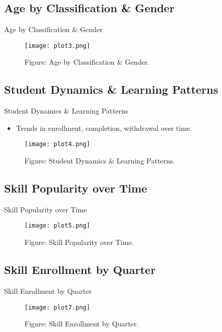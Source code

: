 \documentclass[11pt]{beamer}
\begin{document}
\subsection{Age by Classification \& Gender}
\begin{frame}{Age by Classification \& Gender}
    \begin{figure}
    \centering
    \texttt{[image: plot3.png]}
    \caption{Figure: Age by Classification \& Gender.}
    \end{figure}
\end{frame}

\subsection{Student Dynamics \& Learning Patterns}
\begin{frame}{Student Dynamics \& Learning Patterns}
  \begin{itemize}
    \item Trends in enrollment, completion, withdrawal over time.
  \end{itemize}
    \begin{figure}
    \centering
    \texttt{[image: plot4.png]}
    \caption{Figure: Student Dynamics \& Learning Patterns.}
    \end{figure}
\end{frame}

\subsection{Skill Popularity over Time}
\begin{frame}{Skill Popularity over Time}
    \begin{figure}
    \centering
    \texttt{[image: plot5.png]}
    \caption{Figure: Skill Popularity over Time.}
    \end{figure}
\end{frame}

\subsection{Skill Enrollment by Quarter}
\begin{frame}{Skill Enrollment by Quarter}
    \begin{figure}
    \centering
    \texttt{[image: plot7.png]}
    \caption{Figure: Skill Enrollment by Quarter.}
    \end{figure}
\end{frame}
\end{document}
